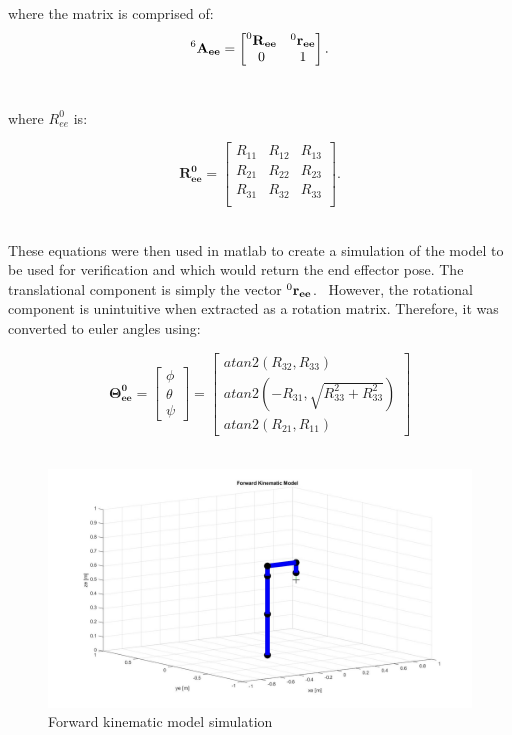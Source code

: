 \documentclass{UoNMCHA}
\numberwithin{equation}{section}
\begin{document}
where the matrix is comprised of:\\

\begin{equation*}
\mathbf{\prescript{6}{}A_{ee}} =
\begin{bmatrix}
\mathbf{\prescript{0}{}R_{ee}} & \mathbf{\prescript{0}{}r_{ee}}   \\
0 & 1  \\
\end{bmatrix}.
\end{equation*}\

where $R^{0}_{ee}$ is:

\begin{equation*}
\mathbf{R^{0}_{ee}} =
\begin{bmatrix}
R_{11} & R_{12} & R_{13} \\
R_{21} & R_{22} & R_{23} \\
R_{31} & R_{32} & R_{33} \\
\end{bmatrix}.
\end{equation*}\

These equations were then used in matlab to create a simulation of the model to be used for verification and which would return the end effector pose. The translational component is simply the vector $\mathbf{\prescript{0}{}r_{ee}}$. \
 However, the rotational component is unintuitive when extracted as a rotation matrix. Therefore, it was converted to euler angles using:

\begin{equation*}
\mathbf{\Theta^{0}_{ee}} =
\begin{bmatrix}
\phi \\ \theta \\\psi 
\end{bmatrix}
= 
\begin{bmatrix}
atan2(R_{32} , R_{33}) \\
atan2(-R_{31} , \sqrt{R_{33}^{2} + R_{33}^{2}}) \\
atan2(R_{21} , R_{11}) 
\end{bmatrix}
\end{equation*}\

\begin{figure}[ht]
	\begin{center}
		\includegraphics[width=.6\linewidth]{Figures/fkinmodel}
		\caption{Forward kinematic model simulation}
		\label{fig:fkmod}
	\end{center}
\end{figure}\
\end{document}
